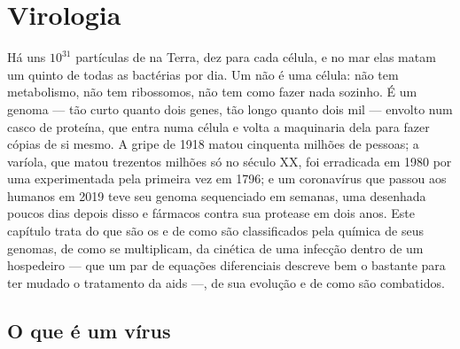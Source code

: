 \chapter{Virologia}\label{ch:b3:virology}

Há uns $10^{31}$ partículas de  na Terra, dez para cada célula, e
no mar elas matam um quinto de todas as bactérias por dia. Um  não
é uma célula: não tem metabolismo, não tem ribossomos, não tem como
fazer nada sozinho. É um genoma --- tão curto quanto dois genes, tão
longo quanto dois mil --- envolto num casco de proteína, que entra numa
célula e volta a maquinaria dela para fazer cópias de si mesmo. A gripe
de 1918 matou cinquenta milhões de pessoas; a varíola, que matou
trezentos milhões só no século XX, foi erradicada em 1980 por uma
 experimentada pela primeira vez em 1796; e um coronavírus que
passou aos humanos em 2019 teve seu genoma sequenciado em semanas, uma
 desenhada poucos dias depois disso e fármacos contra sua
protease em dois anos. Este capítulo trata do que são os  e de
como são classificados pela química de seus genomas, de como se
multiplicam, da cinética de uma infecção dentro de um hospedeiro --- que
um par de equações diferenciais descreve bem o bastante para ter mudado
o tratamento da aids ---, de sua evolução e de como são combatidos.

\section{O que é um vírus}

